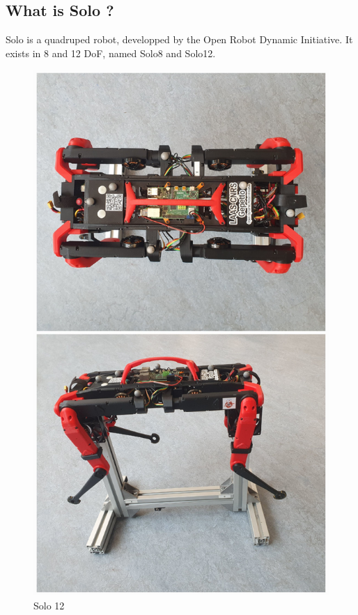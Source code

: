\documentclass[a4paper,10pt]{article}
\begin{document}
\subsection{What is Solo ?}
Solo is a quadruped robot, developped by the Open Robot Dynamic Initiative. It exists in 8 and 12 DoF, named Solo8 and Solo12.
\begin{figure}[H]
\centering
  \includegraphics[width=\linewidth, angle=0, scale=0.5]{./images/Solo3.jpg}
  \caption{Solo 12}
\end{figure}
\end{document}
